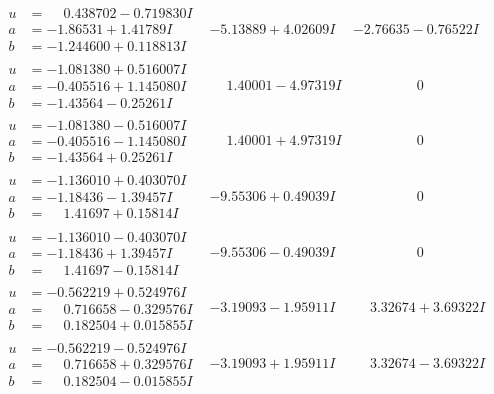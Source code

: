\documentclass[1p]{elsarticle_modified}
\theoremstyle{definition}
\begin{document}
$$\begin{array}{c|c|c}
\begin{aligned}
u &= \phantom{-}0.438702 - 0.719830 I \\
a &= -1.86531 + 1.41789 I \\
b &= -1.244600 + 0.118813 I\end{aligned}
 & -5.13889 + 4.02609 I & -2.76635 - 0.76522 I \\ \hline\begin{aligned}
u &= -1.081380 + 0.516007 I \\
a &= -0.405516 + 1.145080 I \\
b &= -1.43564 - 0.25261 I\end{aligned}
 & \phantom{-}1.40001 - 4.97319 I & \phantom{-0.000000 } 0 \\ \hline\begin{aligned}
u &= -1.081380 - 0.516007 I \\
a &= -0.405516 - 1.145080 I \\
b &= -1.43564 + 0.25261 I\end{aligned}
 & \phantom{-}1.40001 + 4.97319 I & \phantom{-0.000000 } 0 \\ \hline\begin{aligned}
u &= -1.136010 + 0.403070 I \\
a &= -1.18436 - 1.39457 I \\
b &= \phantom{-}1.41697 + 0.15814 I\end{aligned}
 & -9.55306 + 0.49039 I & \phantom{-0.000000 } 0 \\ \hline\begin{aligned}
u &= -1.136010 - 0.403070 I \\
a &= -1.18436 + 1.39457 I \\
b &= \phantom{-}1.41697 - 0.15814 I\end{aligned}
 & -9.55306 - 0.49039 I & \phantom{-0.000000 } 0 \\ \hline\begin{aligned}
u &= -0.562219 + 0.524976 I \\
a &= \phantom{-}0.716658 - 0.329576 I \\
b &= \phantom{-}0.182504 + 0.015855 I\end{aligned}
 & -3.19093 - 1.95911 I & \phantom{-}3.32674 + 3.69322 I \\ \hline\begin{aligned}
u &= -0.562219 - 0.524976 I \\
a &= \phantom{-}0.716658 + 0.329576 I \\
b &= \phantom{-}0.182504 - 0.015855 I\end{aligned}
 & -3.19093 + 1.95911 I & \phantom{-}3.32674 - 3.69322 I \\ \hline\begin{aligned}

\end{aligned}
\end{array}$$
\end{document}
